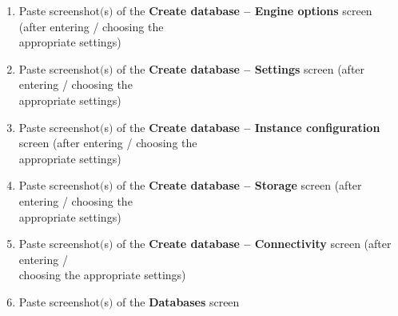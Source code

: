 \documentclass[11pt]{article}
\begin{document}
\begin{enumerate}[resume]
    \vspace{50mm}
    \item Paste screenshot$($s$)$ of the \textbf{Create database – Engine options} screen (after entering / choosing the \\ appropriate settings) \\
    \vspace{5mm}

    \item Paste screenshot$($s$)$ of the \textbf{Create database – Settings} screen (after entering / choosing the \\ appropriate settings) \\
    \vspace{5mm}

    \item Paste screenshot$($s$)$ of the \textbf{Create database – Instance configuration} screen (after entering / choosing the \\ appropriate settings) \\
    \vspace{5mm}

    \item Paste screenshot$($s$)$ of the \textbf{Create database – Storage} screen (after entering / choosing the \\ appropriate settings) \\
    \vspace{5mm}
    
    \item Paste screenshot$($s$)$ of the \textbf{Create database – Connectivity} screen (after entering / \\choosing the appropriate settings) \\

    \item Paste screenshot$($s$)$ of the \textbf{Databases} screen \\
    \vspace{0.01mm}
\end{enumerate}
\end{document}
